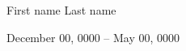 \documentclass[12pt]{extarticle}
\newcommand\AtPageUpperRight[1]{\AtPageUpperLeft{%
 \put(\LenToUnit{\paperwidth},\LenToUnit{0\paperheight}){#1}%
 }}%
\newcommand\AtPageLowerRight[1]{\AtPageLowerLeft{%
 \put(\LenToUnit{\paperwidth},\LenToUnit{0\paperheight}){#1}%
 }}%
\begin{document}
\vspace*{\fill}

\begin{figure}[h!]
\centering
{}
\end{figure}

\begin{center}
\leafline
\end{center}

{\centering \huge First name Last name \par}
{\centering \Large December 00, 0000 -- May 00, 0000 \par}

\vspace*{\fill}


\end{document}
